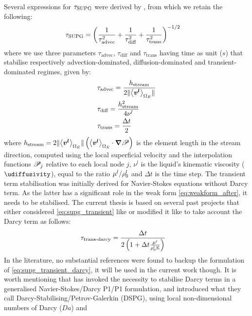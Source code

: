 Several expressions for $\tau_\text{SUPG}$ were derived by \citet{tezduyar_incompressible_1992,tezduyar_finite_2000}, from which
we retain the following:
\begin{align}
& \tau_\text{SUPG} = \left( \frac{1}{\tau_\text{advec}^2} + \frac{1}{\tau_\text{diff}^2} + \frac{1}{\tau_\text{trans}^2}  \right)^{-1/2}
\end{align}
where we use three parameters $\tau_\text{advec}$, $\tau_\text{diff}$ and $\tau_\text{trans}$ 
having time as unit ($s$) that stabilise respectively advection-dominated, diffusion-dominated and transient-dominated
regimes, given by:
\begin{align}
& \tau_\text{advec} = \frac{h_\text{stream}}{2 \lVert \left \langle \boldsymbol{v^l} \right \rangle_{\Omega_E} \rVert}  \\ 
& \tau_\text{diff} = \frac{h_\text{stream}^2}{4\nu^l}  \\ 
\label{eq:supg_transient}
& \tau_\text{trans} = \frac{\Delta t}{2}
\end{align}
where $h_\text{stream}=2\lVert \left \langle \boldsymbol{v^l} \right \rangle_{\Omega_E} \rVert\left( \left \langle \boldsymbol{v^l} \right \rangle_{\Omega_E} \cdot \boldsymbol{\nabla} \mathscr{P} \right)$ is the element length in the stream direction, computed using
the local superficial velocity and the interpolation functions $\mathscr{P}_j$ relative to each local node $j$,
$\nu^l$ is the liquid's kinematic viscosity ($\si{\udiffusivity}$), equal to the ratio $\mu^l/\rho_{0}^{l}$
 and $\Delta t$ is the time step.
The transient term stabilisation was initially derived for Navier-Stokes equations without Darcy term.
As the latter has a significant role in the weak form \cref{eq:weakform_after}, it needs to be stabilised.
The current thesis is based on several past projects that either considered \cref{eq:supg_transient}
like \citet{liu_finite_2005} or modified it like \citet{gouttebroze_modelisation_2005,rivaux_simulation_2011} 
to take account the Darcy term as follows:
\begin{align}
\label{eq:supg_transient_darcy}
& \tau_\text{trans-darcy} = \frac{\Delta t}{2\left( 1+\Delta t \frac{\mu^l}{\rho_{0}^{l} \mathbb{K}} \right)}
\end{align}
In the literature, no substantial references were found to backup the formulation of \cref{eq:supg_transient_darcy}, it will
be used in the current work though. It is worth mentioning that \citet{zabaras_stabilized_2004} has invoked the necessity
to stabilise Darcy terms in a generalised Navier-Stokes/Darcy P1/P1 formulation, 
and introduced what they call Darcy-Stabilising/Petrov-Galerkin (DSPG), using local non-dimensional numbers of Darcy ($Da$) and

